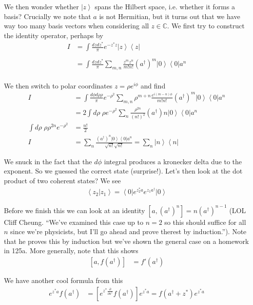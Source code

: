 \documentclass[10pt]{report}
\newcommand{\bra}[1]{\left<#1\right|}
\newcommand{\ket}[1]{\left|#1\right>}
\newcommand{\dotp}[2]{\left<#1\left.\right|#2\right>}
\newcommand{\pd}[2]{\frac{\partial #1}{\partial#2}}
\begin{document}
We then wonder whether $\ket{z}$ spans the Hilbert space, i.e. whether it forms a basis? Crucially we note that $a$ is not Hermitian, but it turns out that we have way too many basis vectors when considering all $z \in \mathbb{C}$. We first try to construct the identity operator, perhaps by
\begin{align}
    I &= \int\limits_{}^{}\frac{dz dz^*}{\pi}e^{-z^*z}\ket{z}\bra{z}\\
    &= \int\limits_{}^{}\frac{dz dz^*}{\pi}\sum_{m,n}^{}\frac{z^mz^n}{m!n!}(a^\dagger)^m\ket{0}\bra{0}a^n
\end{align}

We then switch to polar coordinates $z = \rho e^{i\phi}$ and find
\begin{align}
    I &= \int \frac{d\phi d\rho \rho}{\pi}e^{-\rho^2}\sum_{m,n}^{}\rho^{m + n}\frac{e^{i(m-n)\phi}}{m!n!}(a^\dagger)^m\ket{0}\bra{0}a^n\\
    &= 2\int d\rho\; \rho e^{-\rho^2}\sum_{n}^{}\frac{\rho^{2n}}{(n!)^2}(a^\dagger)n\ket{0}\bra{0}a^n\\
    \int d\rho\; \rho \rho^{2n}e^{-\rho^2} &= \frac{n!}{2}\\
    I &= \sum_{n}^{}\frac{(a^\dagger)^n\ket{0}\bra{0}a^n}{\sqrt{n!}\sqrt{n!}} = \sum_{n}^{}\ket{n}\bra{n}
\end{align}

We snuck in the fact that the $d\phi$ integral produces a kronecker delta due to the exponent. So we guessed the correct state (surprise!). Let's then look at the dot product of two coherent states? We see
\begin{align}
    \dotp{z_2}{z_1} = \bra{0}e^{z_2^*a}e^{z_1a^\dagger}\ket{0}\label{4.11.temp}
\end{align}

Before we finish this we can look at an identity $\left[ a, (a^\dagger)^n \right] = n(a^\dagger)^{n-1}$ (LOL Cliff Cheung. ``We've examined this case up to $n=2$ so this should suffice for all $n$ since we're physicists, but I'll go ahead and prove therest by induction.''). Note that he proves this by induction but we've shown the general case on a homework in 125a. More generally, note that this shows
\begin{align}
    \left[ a, f(a^\dagger) \right] &= f'(a^\dagger)
\end{align}

We have another cool formula from this
\begin{align}
    e^{z^*a}f(a^\dagger) &= \left[ e^{z^*\pd{}{a^\dagger}}f(a^\dagger) \right]e^{z^*a} =f(a^\dagger + z^*)e^{z^*a}
\end{align}
\end{document}
